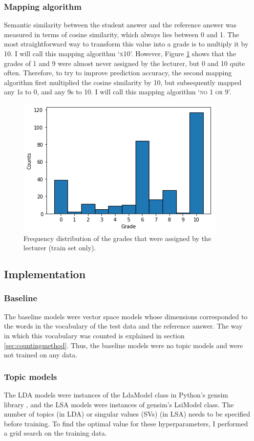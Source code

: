 \documentclass[a4paper,10pt,twoside]{article}
\begin{document}
\subsubsection{Mapping algorithm}
Semantic similarity between the student answer and the reference answer was measured in terms of cosine similarity, which always lies between 0 and 1. The most straightforward way to transform this value into a grade is to multiply it by 10. I will call this mapping algorithm `\textsc{x10}'. However, Figure \ref{fig:histogram} shows that the grades of 1 and 9 were almost never assigned by the lecturer, but 0 and 10 quite often. Therefore, to try to improve prediction accuracy, the second mapping algorithm first multiplied the cosine similarity by 10, but subsequently mapped any 1s to 0, and any 9s to 10. I will call this mapping algorithm `\textsc{no 1 or 9}'.

\begin{figure}[h]
	\centering
	\includegraphics[width=0.5\linewidth]{"Histogram of grades"}
	\caption{Frequency distribution of the grades that were assigned by the lecturer (train set only).}
	\label{fig:histogram}
\end{figure} 

\subsection{Implementation}

\subsubsection{Baseline}
The baseline models were vector space models whose dimensions corresponded to the words in the vocabulary of the test data and the reference answer. The way in which this vocabulary was counted is explained in section \ref{sec:countingmethod}. Thus, the baseline models were no topic models and were not trained on any data.

\subsubsection{Topic models}
The LDA models were instances of the LdaModel class in Python's gensim library \cite{rehurek2010}, and the LSA models were instances of gensim's LsiModel class. The number of topics (in LDA) or singular values (SVs) (in LSA) needs to be specified before training. To find the optimal value for these hyperparameters, I performed a grid search on the training data.
\end{document}
